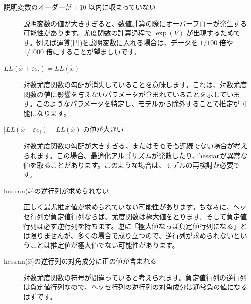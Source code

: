 \begin{description}
    \item[説明変数のオーダーが $\pm 10$ 以内に収まっていない] 説明変数の値が大きすぎると、数値計算の際にオーバーフローが発生する可能性があります。尤度関数の計算過程で $\exp(V)$ が出現するためです。例えば運賃(円)を説明変数に入れる場合は、データを $1/100$ 倍や $1/1000$ 倍にすることが望ましいです。
    \item[$LL(\hat x + \varepsilon e_i)=LL(\hat x)$] 対数尤度関数の勾配が消失していることを意味します。これは、対数尤度関数の値に影響を与えないパラメータが含まれていることを示しています。このようなパラメータを特定し、モデルから除外することで推定が可能になります。
    \item[$|LL(\hat x + \varepsilon e_i)-LL(\hat x)|$の値が大きい] 対数尤度関数の勾配が大きすぎる、またはそもそも連続でない場合が考えられます。この場合、最適化アルゴリズムが発散したり、hessianが異常な値を取ることがあります。このような場合は、モデルの再検討が必要です。
    \item[hessian($\hat x$)の逆行列が求められない] 正しく最尤推定値が求められていない可能性があります。ちなみに、ヘッセ行列が負定値行列ならば、尤度関数は極大値をとります。そして負定値行列は必ず逆行列を持ちます。逆に「極大値ならば負定値行列になる」とは限りませんが、多くの場合で成り立つので、逆行列が求められないということは推定値が極大値でない可能性があります。
    \item[hessian($\hat x$)の逆行列の対角成分に正の値が含まれる] 対数尤度関数の符号が間違っていると考えられます。負定値行列の逆行列は負定値行列なので、ヘッセ行列の逆行列の対角成分は通常負の値になるはずです。
\end{description}
